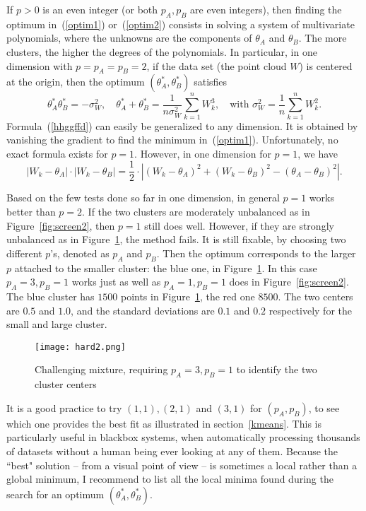 \documentclass[oneside,10pt]{book}
\begin{document}
If $p>0$ is an even integer (or both $p_A,p_B$ are even integers), then finding the optimum in~(\ref{optim1}) or~(\ref{optim2}) consists in solving a system of 
 multivariate polynomials, where the 
 unknowns are the components of $\theta_A$ and $\theta_B$. The more clusters, the higher the degrees of the polynomials. In particular, in one dimension with $p=p_A=p_B=2$, if the data set (the point cloud $W$) is centered at the origin, then the optimum $(\theta_A^*,\theta_B^*)$ satisfies 
\begin{equation}
\theta_A^* \theta_B^* =-\sigma^2_W, \quad \theta_A^*+\theta_B^*=\frac{1}{n\sigma^2_W}\sum_{k=1}^n W_k^3, 
\quad \text{with } \sigma^2_W=\frac{1}{n}\sum_{k=1}^n W_k^2. \label{hhggffd}
\end{equation}
Formula~(\ref{hhggffd}) can easily be generalized to any dimension. It is obtained by vanishing the gradient to find the minimum in~(\ref{optim1}). Unfortunately, no exact formula exists for $p=1$. However, in one dimension for $p=1$, we have
$$
|W_k-\theta_A|\cdot |W_k-\theta_B| = \frac{1}{2}\cdot | (W_k-\theta_A)^2 + (W_k-\theta_B)^2-(\theta_A -\theta_B)^2 |.
$$

Based on the few tests done so far in one dimension, in general $p=1$ works better than $p=2$. If the two clusters are moderately unbalanced as in Figure~\ref{fig:screen2}, then $p=1$ still does well. 
However, if they are strongly unbalanced as in Figure~\ref{fig:hard}, the method fails.  It is still fixable, by choosing two different $p$'s,  denoted as $p_A$ and $p_B$. Then the optimum 
corresponds to the larger $p$ attached to
 the smaller cluster: the blue one, in Figure~\ref{fig:hard}.  In this case $p_A=3,p_B=1$ works just as well  as $p_A=1, p_B=1$ does
 in Figure~\ref{fig:screen2}.
The blue cluster has $1500$ points in Figure~\ref{fig:hard}, the red one $8500$. The two centers are $0.5$ and $1.0$,
   and the standard deviations are $0.1$ and $0.2$ respectively for the small and large cluster.

\begin{figure}[H]
\centering
\texttt{[image: hard2.png]}  
\caption{Challenging mixture, requiring $p_A=3,p_B=1$ to identify the two cluster centers}
\label{fig:hard}
\end{figure}


 It is a good practice to try $(1,1), (2,1)$ and $(3,1)$ for $(p_A,p_B)$, to see which one provides the best fit as illustrated
 in section~\ref{kmeans}. This is particularly useful in blackbox systems, when automatically processing thousands of datasets without a human being ever looking at any of them.  Because the 
 ``best" solution -- from a visual point of view -- is sometimes a local rather than a global minimum, I recommend to list all the local minima found during the search for an 
 optimum $(\theta_A^*,\theta_B^*)$. 
\end{document}
